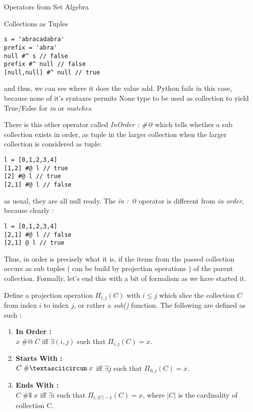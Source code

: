 \begin{section}{Operators from Set Algebra}
\begin{subsection}{Collections as Tuples}
\begin{lstlisting}[style=JexlStyle]
s = 'abracadabra'
prefix = 'abra'
null #^ s // false 
prefix #^ null // false 
[null,null] #^ null // true 
\end{lstlisting}

and thus, we can see where it does the value add.
Python fails in this case, because none of it's syntaxes permits None type
to be used as collection to yield True/False for \emph{in} or \emph{matches}.  

There is this other operator called \emph{InOrder : \#@ }  which
tells whether a sub collection exists in order, as tuple in the larger collection 
when the larger collection is considered as tuple:

\begin{lstlisting}[style=JexlStyle]
l = [0,1,2,3,4]
[1,2] #@ l // true 
[2] #@ l // true 
[2,1] #@ l // false 
\end{lstlisting}
as usual, they are all null ready.    
The \emph{in : @} operator is different from \emph{in order},
because clearly :

\begin{lstlisting}[style=JexlStyle]
l = [0,1,2,3,4]
[2,1] #@ l // false 
[2,1] @ l // true 
\end{lstlisting}
 
Thus, in order is precisely what it is, if the items from the passed collection
occurs as sub tuples ( can be build by projection operations ) of the parent collection. 
Formally, let's end this with a bit of formalism as we have started it.

Define a projection operation $\Pi_{i,j}(C) $ with $i \le j $ which slice the collection $C$
from index $i$ to index $j$, or rather a \emph{sub()} function. 
The following are defined as such :

\begin{enumerate}
\item{
  \textbf{ In Order :} \\
   $ x \; \#@ \; C $ iff $\exists (i,j)$ such that $\Pi_{i,j}(C) = x $.  
}
\item{
  \textbf{ Starts With :} \\
   $ C \; \# \textasciicircum \; x $ iff $\exists j$ such that $\Pi_{0,j}(C) = x $.  
}
\item{
  \textbf{ Ends With :} \\
   $ C \; \#\$ \; x $ iff $\exists i$ such that $\Pi_{i,|C|-1}(C) = x $,
   where $|C|$ is the cardinality of collection C.
}
\end{enumerate}
\end{subsection}


\end{section}
